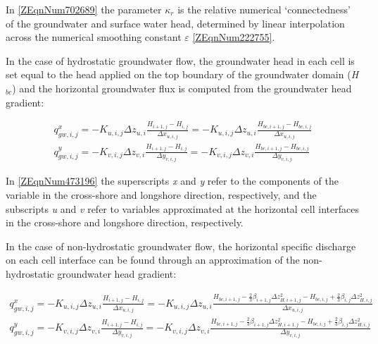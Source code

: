 \documentclass{article}
\begin{document}
\noindent 

\noindent In \eqref{ZEqnNum702689} the parameter \textit{$\kappa $${}_{r}$} is the relative numerical `connectedness' of the groundwater and surface water head, determined by linear interpolation across the numerical smoothing constant \textit{$\varepsilon $} \eqref{ZEqnNum222755}.

\noindent 

\noindent In the case of hydrostatic groundwater flow, the groundwater head in each cell is set equal to the head applied on the top boundary of the groundwater domain (\textit{H${}_{bc}$}) and the horizontal groundwater flux is computed from the groundwater head gradient:

\noindent 
\begin{equation} \label{ZEqnNum473196} 
\begin{array}{l} {q_{gw,i,j}^{x} =-K_{u,i,j} \Delta z_{u,i} \frac{H_{i+1,j} -H_{i,j} }{\Delta x_{u,i,j} } =-K_{u,i,j} \Delta z_{u,i} \frac{H_{bc,i+1,j} -H_{bc,i,j} }{\Delta x_{u,i,j} } } \\ {q_{gw,i,j}^{y} =-K_{v,i,j} \Delta z_{v,i} \frac{H_{i+1,j} -H_{i,j} }{\Delta y_{v,i,j} } =-K_{v,i,j} \Delta z_{v,i} \frac{H_{bc,i+1,j} -H_{bc,i,j} }{\Delta y_{v,i,j} } } \end{array} 
\end{equation} 


\noindent In \eqref{ZEqnNum473196} the superscripts \textit{x} and \textit{y} refer to the components of the variable in the cross-shore and longshore direction, respectively, and the subscripts \textit{u} and \textit{v} refer to variables approximated at the horizontal cell interfaces in the cross-shore and longshore direction, respectively.

\noindent 

\noindent In the case of non-hydrostatic groundwater flow, the horizontal specific discharge on each cell interface can be found through an approximation of the non-hydrostatic groundwater head gradient:

\noindent 
\begin{equation} \label{ZEqnNum628356} 
\begin{array}{l} {q_{gw,i,j}^{x} =-K_{u,i,j} \Delta z_{u,i} \frac{H_{i+1,j} -H_{i,j} }{\Delta x_{u,i,j} } =-K_{u,i,j} \Delta z_{u,i} \frac{H_{bc,i+1,j} -\frac{2}{3} \beta _{i+1,j} \Delta z_{H,i+1,j}^{2} -H_{bc,i,j} +\frac{2}{3} \beta _{i,j} \Delta z_{H,i,j}^{2} }{\Delta x_{u,i,j} } } \\ {q_{gw,i,j}^{y} =-K_{v,i,j} \Delta z_{v,i} \frac{H_{i+1,j} -H_{i,j} }{\Delta y_{v,i,j} } =-K_{v,i,j} \Delta z_{v,i} \frac{H_{bc,i+1,j} -\frac{2}{3} \beta _{i+1,j} \Delta z_{H,i+1,j}^{2} -H_{bc,i,j} +\frac{2}{3} \beta _{i,j} \Delta z_{H,i,j}^{2} }{\Delta y_{v,i,j} } } \end{array} 
\end{equation} 
\end{document}
